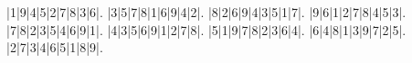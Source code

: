 \begin{sudoku}
|1|9|4|5|2|7|8|3|6|.
|3|5|7|8|1|6|9|4|2|.
|8|2|6|9|4|3|5|1|7|.
|9|6|1|2|7|8|4|5|3|.
|7|8|2|3|5|4|6|9|1|.
|4|3|5|6|9|1|2|7|8|.
|5|1|9|7|8|2|3|6|4|.
|6|4|8|1|3|9|7|2|5|.
|2|7|3|4|6|5|1|8|9|.
\end{sudoku}